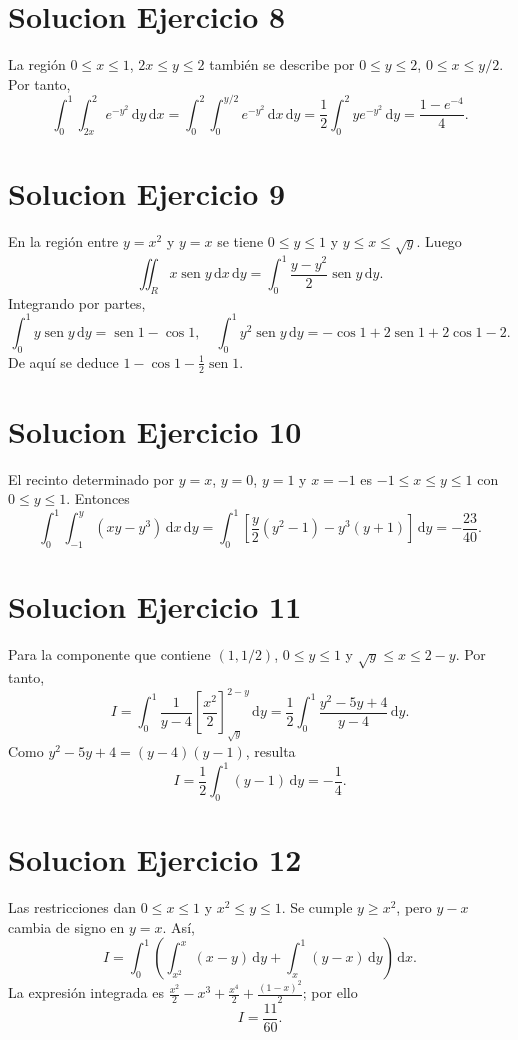 \documentclass[11pt,a4paper]{article}
\DeclareMathOperator{\sen}{sen}
\newcommand{\dd}{\,\mathrm{d}}
\begin{document}
\section{Solucion Ejercicio 8}
La región $0\le x\le1$, $2x\le y\le2$ también se describe por $0\le y\le2$, $0\le x\le y/2$. Por tanto,
\[\int_0^1\int_{2x}^2 e^{-y^2}\dd y\dd x=\int_0^2\int_0^{y/2}e^{-y^2}\dd x\dd y=\frac12\int_0^2ye^{-y^2}\dd y=\boxed{\frac{1-e^{-4}}4}.\]

\section{Solucion Ejercicio 9}
En la región entre $y=x^2$ y $y=x$ se tiene $0\le y\le1$ y $y\le x\le\sqrt y$. Luego
\[\iint_R x\sen y\dd x\dd y=\int_0^1\frac{y-y^2}{2}\sen y\dd y.\]
Integrando por partes,
\[\int_0^1y\sen y\dd y=\sen1-\cos1,\quad \int_0^1y^2\sen y\dd y=-\cos1+2\sen1+2\cos1-2.\]
De aquí se deduce $\boxed{1-\cos1-\tfrac12\sen1}$.

\section{Solucion Ejercicio 10}
El recinto determinado por $y=x$, $y=0$, $y=1$ y $x=-1$ es $-1\le x\le y\le1$ con $0\le y\le1$. Entonces
\[\int_0^1\int_{-1}^{y}(xy-y^3)\dd x\dd y=\int_0^1\left[\frac y2(y^2-1)-y^3(y+1)\right]\dd y=\boxed{-\frac{23}{40}}.\]

\section{Solucion Ejercicio 11}
Para la componente que contiene $(1,1/2)$, $0\le y\le1$ y $\sqrt y\le x\le2-y$. Por tanto,
\[I=\int_0^1\frac1{y-4}\left[\frac{x^2}{2}\right]_{\sqrt y}^{2-y}\dd y=\frac12\int_0^1\frac{y^2-5y+4}{y-4}\dd y.\]
Como $y^2-5y+4=(y-4)(y-1)$, resulta
\[I=\frac12\int_0^1(y-1)\dd y=\boxed{-\frac14}.\]

\section{Solucion Ejercicio 12}
Las restricciones dan $0\le x\le1$ y $x^2\le y\le1$. Se cumple $y\ge x^2$, pero $y-x$ cambia de signo en $y=x$. Así,
\[I=\int_0^1\left(\int_{x^2}^{x}(x-y)\dd y+\int_x^1(y-x)\dd y\right)\dd x.\]
La expresión integrada es $\frac{x^2}{2}-x^3+\frac{x^4}{2}+\frac{(1-x)^2}{2}$; por ello
\[I=\boxed{\frac{11}{60}}.\]
\end{document}
